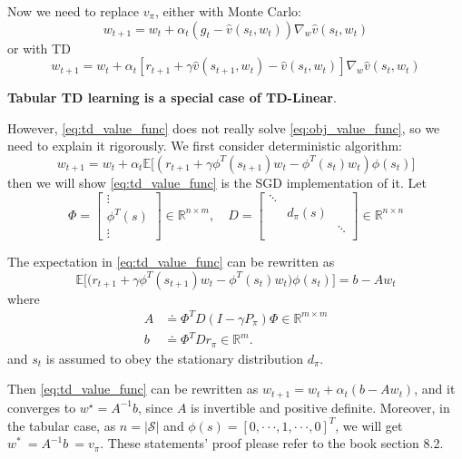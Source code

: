 \documentclass[10pt]{elegantbook}
\begin{document}
Now we need to replace $v_{\pi}$, either with Monte Carlo:
\[ w_{t+1}=w_{t}+\alpha_{t}(g_{t}-\hat{v}(s_{t},w_{t}))\nabla_{w}\hat{v}(s_{t},w_{t}) \]
or with TD
\begin{equation} \label{eq:td_value_func}
    w_{t+1}=w_{t}+\alpha_{t}\left[r_{t+1}+\gamma\hat{v}(s_{t+1},w_{t})-\hat{v}(s_{t},w_{t})\right]\nabla_{w}\hat{v}(s_{t},w_{t}) 
\end{equation}

    \textbf{Tabular TD learning is a special case of TD-Linear}.

    However, \ref{eq:td_value_func} does not really solve \ref{eq:obj_value_func}, so we need to explain it rigorously. We first consider deterministic
algorithm:
\begin{equation}
    w_{t+1}=w_{t}+\alpha_{t}\mathbb{E}\biggl[(r_{t+1}+\gamma\phi^{T}(s_{t+1})w_{t}-\phi^{T}(s_{t})w_{t})\phi(s_{t})\biggr]
\end{equation}
then we will show \ref{eq:td_value_func} is the SGD implementation of it. Let 
\[
\Phi=\left[
    \begin{array}{c}{{\vdots}}\\ {{\phi^{T}(s)}}\\ {{\vdots}}
    \end{array}\right]\in\mathbb{R}^{n\times m},
\quad D=\left[
    \begin{array}{ccc}{{\ddots}}&{{}}\\ {{}}&{{d_{\pi}(s)}}&{{}}\\ {{}}&{{}}&{{\ddots}}\\
    \end{array}\right]\in\mathbb{R}^{n\times n}
\]

\begin{lemma} \label{lemma:td_value_func_rep}
    The expectation in \ref{eq:td_value_func} can be rewritten as
    \[ \mathbb{E}\Big[\big(r_{t+1}+\gamma\phi^{T}(s_{t+1})w_{t}-\phi^{T}(s_{t})w_{t}\big)\phi(s_{t})\Big]=b-A w_{t} \]
    where
    \begin{align*}
        A &\doteq \Phi^{T}D(I-\gamma P_{\pi})\Phi\in\mathbb{R}^{m\times m} \\ 
        b &\doteq \Phi^{T}D r_{\pi}\in\mathbb{R}^{m}.
    \end{align*}
    and $s_t$ is assumed to obey the stationary distribution $d_{\pi}$.
\end{lemma}

Then \ref{eq:td_value_func} can be rewritten as $w_{t+1}=w_{t}+\alpha_{t}(b-A w_{t})$, and it converges to $w^{\star}=A^{-1}b$, since 
$A$ is invertible and positive definite. Moreover, in the tabular case, as $n = |\mathcal S|$ and $\phi(s)=[0,\cdot\cdot\cdot,1,\cdot\cdot\cdot,0]^{T}$,
we will get $w^{*}\ =A^{-1}b\ =v_{\pi}$. These statements' proof please refer to the book section 8.2.
\end{document}
